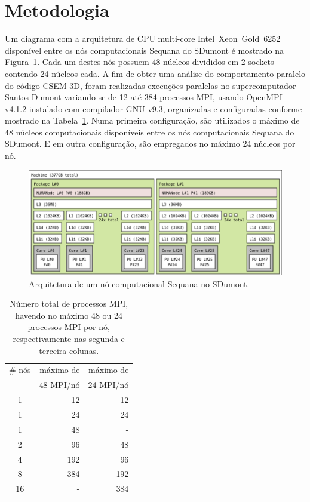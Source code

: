 \documentclass[12pt]{article}
\begin{document}
\section{Metodologia}
\label{sec:metodo}
%
Um diagrama com a arquitetura de CPU multi-core Intel\textregistered~Xeon\textregistered~Gold~6252 disponível entre os nós computacionais Sequana do SDumont é mostrado na Figura~\ref{fig:sequananode}. Cada um destes nós possuem 48 núcleos divididos em 2 sockets contendo 24 núcleos cada. A fim de obter uma análise do comportamento paralelo do código CSEM 3D, foram realizadas execuções paralelas no supercomputador Santos Dumont variando-se de 12 até 384 processos MPI\cite{mpi31}, usando OpenMPI v4.1.2 instalado com compilador GNU v9.3,  organizadas e configuradas conforme mostrado na Tabela~\ref{tab:parallelconfig}. Numa primeira configuração, são utilizados o máximo de 48 núcleos computacionais disponíveis entre os nós computacionais Sequana do SDumont. E em outra configuração, são empregados no máximo 24 núcleos por nó.
%
\begin{figure}
\centering
\includegraphics[width=.66\textwidth]{figures/sequanacpudev.png}
\caption{Arquitetura de um nó computacional Sequana no SDumont.}
\label{fig:sequananode}
\end{figure}
%
\begin{table}
\centering
\footnotesize
\caption{Número total de processos MPI, havendo no máximo 48 ou 24 processos MPI por nó, respectivamente nas segunda e terceira colunas.}
\label{tab:parallelconfig}
\begin{tabular}{crr}
\hline
\# nós	&	máximo de	&	máximo de	\\
	&	48 MPI/nó	&	24 MPI/nó	\\
\hline
1	&	12	&	12	\\
1	&	24	&	24	\\
1	&	48	&	 -	\\
2	&	96	&	48	\\
4	&	192	&	96	\\
8	&	384	&	192	\\
16	&	 -	&	384	\\
\hline
\end{tabular}
\end{table}
\end{document}

